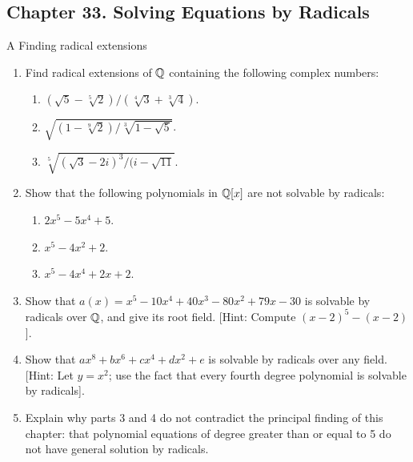 \subsection*{Chapter 33. Solving Equations by Radicals}


\begin{exercise}{A Finding radical extensions}
\begin{enumerate}
    \item Find radical extensions of $\mathbb{Q}$ containing the following complex numbers:
    \begin{enumerate}
        \item $(\sqrt{5}-\sqrt[5]{2})/(\sqrt[4]{3}+\sqrt[3]{4})$.
        \item $\sqrt{(1-\sqrt[9]{2})/\sqrt[3]{1-\sqrt{5}}}$.
        \item $\sqrt[5]{(\sqrt{3}-2i)^3/(i-\sqrt{11}}$.
    \end{enumerate}
    \item Show that the following polynomials in $\mathbb{Q}[x]$ are not solvable by radicals:
    \begin{enumerate}
        \item $2x^5-5x^4+5$.
        \item $x^5-4x^2+2$.
        \item $x^5-4x^4+2x+2$.
    \end{enumerate}
    \item Show that $a(x)=x^5-10x^4+40x^3-80x^2+79x-30$ is solvable by radicals over $\mathbb{Q}$, and give its root field. [Hint: Compute $(x-2)^5-(x-2)$].
    \item Show that $ax^8+bx^6+cx^4+dx^2+e$ is solvable by radicals over any field. [Hint: Let $y=x^2$; use the fact that every fourth degree polynomial is solvable by radicals].
    \item Explain why parts 3 and 4 do not contradict the principal finding of this chapter: that polynomial equations of degree greater than or equal to 5 do not have general solution by radicals.
\end{enumerate}
\end{exercise}
